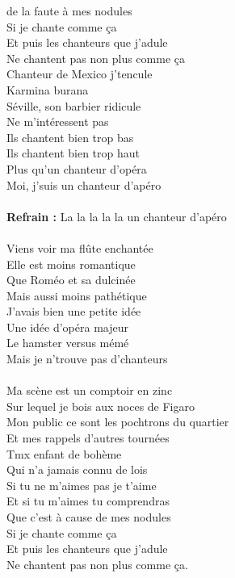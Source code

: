 
 de la faute à mes nodules
\\Si je chante comme ça
\\Et puis les chanteurs que j'adule
\\Ne chantent pas non plus comme ça
\\Chanteur de Mexico j'tencule
\\Karmina burana
\\Séville, son barbier ridicule
\\Ne m'intéressent pas
\\Ils chantent bien trop bas
\\Ils chantent bien trop haut
\\Plus qu'un chanteur d'opéra
\\Moi, j'suis un chanteur d'apéro
\\\\\textbf{Refrain :}
{La la la la la un chanteur d'apéro}
\\\\Viens voir ma flûte enchantée
\\Elle est moins romantique
\\Que Roméo et sa dulcinée
\\Mais aussi moins pathétique
\\J'avais bien une petite idée
\\Une idée d'opéra majeur
\\Le hamster versus mémé
\\Mais je n'trouve pas d'chanteurs
\\\\Ma scène est un comptoir en zinc
\\Sur lequel je bois aux noces de Figaro
\\Mon public ce sont les pochtrons du quartier
\\Et mes rappels d'autres tournées
\\Tmx enfant de bohème 
\\Qui n'a jamais connu de lois
\\Si tu ne m'aimes pas je t'aime
\\Et si tu m'aimes tu comprendras
\\Que c'est à cause de mes nodules
\\Si je chante comme ça
\\Et puis les chanteurs que j'adule
\\Ne chantent pas non plus comme ça.

\breakpage